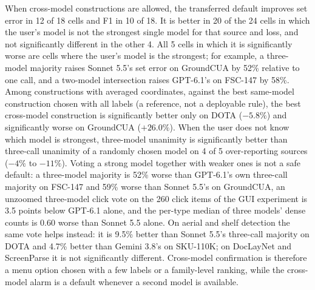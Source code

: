 When cross-model constructions are allowed, the transferred default improves set error in 12 of 18 cells and F1 in 10 of 18. It is better in 20 of the 24 cells in which the user's model is not the strongest single model for that source and loss, and not significantly different in the other 4. All 5 cells in which it is significantly worse are cells where the user's model is the strongest; for example, a three-model majority raises Sonnet 5.5's set error on GroundCUA by 52\% relative to one call, and a two-model intersection raises GPT-6.1's on FSC-147 by 58\%. Among constructions with averaged coordinates, against the best same-model construction chosen with all labels (a reference, not a deployable rule), the best cross-model construction is significantly better only on DOTA ($-5.8\%$) and significantly worse on GroundCUA ($+26.0\%$). When the user does not know which model is strongest, three-model unanimity is significantly better than three-call unanimity of a randomly chosen model on 4 of 5 over-reporting sources ($-4\%$ to $-11\%$). Voting a strong model together with weaker ones is not a safe default: a three-model majority is 52\% worse than GPT-6.1's own three-call majority on FSC-147 and 59\% worse than Sonnet 5.5's on GroundCUA, an unzoomed three-model click vote on the 260 click items of the GUI experiment is 3.5 points below GPT-6.1 alone, and the per-type median of three models' dense counts is 0.60 worse than Sonnet 5.5 alone. On aerial and shelf detection the same vote helps instead: it is 9.5\% better than Sonnet 5.5's three-call majority on DOTA and 4.7\% better than Gemini 3.8's on SKU-110K; on DocLayNet and ScreenParse it is not significantly different. Cross-model confirmation is therefore a menu option chosen with a few labels or a family-level ranking, while the cross-model alarm is a default whenever a second model is available.

